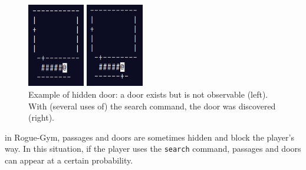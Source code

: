 \documentclass[conference]{IEEEtran}
\begin{document}
\begin{figure}[t]
  \begin{minipage}[cbt]{4cm}
   \centering
   \includegraphics[width=2.5cm]{pictures/hidden2-1.png}
  \end{minipage}
  \begin{minipage}[cbt]{4cm}
   \centering
   \includegraphics[width=2.5cm]{pictures/hidden2-2.png}
  \end{minipage}
  \caption{Example of hidden door: 
 a door exists but is not observable (left). With (several uses of)
 the search command, the door was discovered (right).} \label{hidden}
\end{figure}
in Rogue-Gym, passages and doors are sometimes hidden and block the
player's way.  In this situation, if the player uses the \texttt{search}
command, passages and doors can appear at a certain probability. \par
\end{document}
